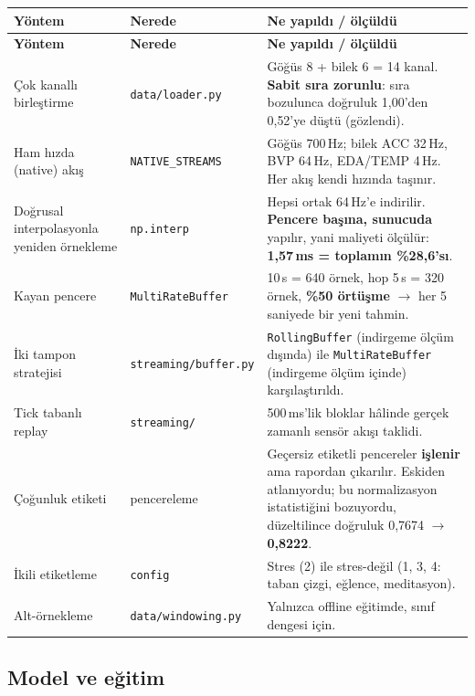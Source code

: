 \documentclass[11pt,a4paper]{article}
\newcommand{\ms}{\,ms}
\newcommand{\kod}[1]{\texttt{\small #1}}
\newcommand{\dosya}[1]{\texttt{\footnotesize #1}}
\begin{document}
\begin{longtable}{@{}p{4.0cm}p{2.9cm}p{8.6cm}@{}}
\toprule
\textbf{Yöntem} & \textbf{Nerede} & \textbf{Ne yapıldı / ölçüldü} \\
\midrule
\endfirsthead
\toprule
\textbf{Yöntem} & \textbf{Nerede} & \textbf{Ne yapıldı / ölçüldü} \\
\midrule
\endhead
Çok kanallı birleştirme & \dosya{data/loader.py} &
Göğüs 8 + bilek 6 = 14 kanal. \textbf{Sabit sıra zorunlu}: sıra bozulunca
doğruluk 1{,}00'den 0{,}52'ye düştü (gözlendi). \\
\addlinespace
Ham hızda (native) akış & \kod{NATIVE\_STREAMS} &
Göğüs 700\,Hz; bilek ACC 32\,Hz, BVP 64\,Hz, EDA/TEMP 4\,Hz. Her akış kendi
hızında taşınır. \\
\addlinespace
Doğrusal interpolasyonla yeniden örnekleme & \kod{np.interp} &
Hepsi ortak 64\,Hz'e indirilir. \textbf{Pencere başına, sunucuda} yapılır, yani
maliyeti ölçülür: \textbf{1{,}57\ms{} = toplamın \%28{,}6'sı}. \\
\addlinespace
Kayan pencere & \kod{MultiRateBuffer} &
10\,s = 640 örnek, hop 5\,s = 320 örnek, \textbf{\%50 örtüşme} $\rightarrow$
her 5 saniyede bir yeni tahmin. \\
\addlinespace
İki tampon stratejisi & \dosya{streaming/buffer.py} &
\kod{RollingBuffer} (indirgeme ölçüm dışında) ile \kod{MultiRateBuffer}
(indirgeme ölçüm içinde) karşılaştırıldı. \\
\addlinespace
Tick tabanlı replay & \dosya{streaming/} &
500\ms'lik bloklar hâlinde gerçek zamanlı sensör akışı taklidi. \\
\addlinespace
Çoğunluk etiketi & pencereleme &
Geçersiz etiketli pencereler \textbf{işlenir} ama rapordan çıkarılır. Eskiden
atlanıyordu; bu normalizasyon istatistiğini bozuyordu, düzeltilince doğruluk
0{,}7674 $\rightarrow$ \textbf{0{,}8222}. \\
\addlinespace
İkili etiketleme & \kod{config} &
Stres (2) ile stres-değil (1, 3, 4: taban çizgi, eğlence, meditasyon). \\
\addlinespace
Alt-örnekleme & \dosya{data/windowing.py} &
Yalnızca offline eğitimde, sınıf dengesi için. \\
\bottomrule
\end{longtable}

\subsection{Model ve eğitim}
\end{document}

